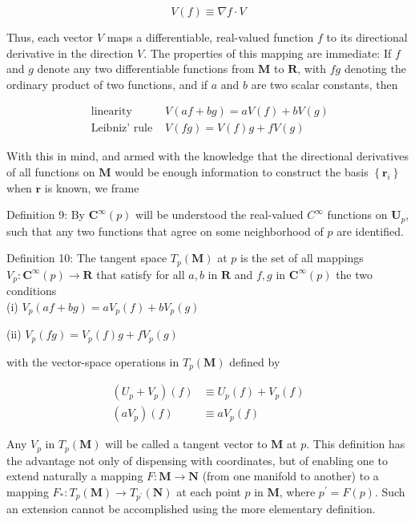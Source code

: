 \documentclass[10pt]{article}
\begin{document}
$$
V(f) \equiv \nabla f \cdot V
$$

Thus, each vector $V$ maps a differentiable, real-valued function $f$ to its directional derivative in the direction $V$. The properties of this mapping are immediate: If $f$ and $g$ denote any two differentiable functions from $\mathbf{M}$ to $\mathbf{R}$, with $f g$ denoting the ordinary product of two functions, and if $a$ and $b$ are two scalar constants, then

$$
\begin{aligned}
\text { linearity } & V(a f+b g)=a V(f)+b V(g) \\
\text { Leibniz' rule } & V(f g)=V(f) g+f V(g)
\end{aligned}
$$

With this in mind, and armed with the knowledge that the directional derivatives of all functions on $\mathbf{M}$ would be enough information to construct the basis $\left\{\mathbf{r}_{i}\right\}$ when $\mathbf{r}$ is known, we frame

Definition 9: By $\mathbf{C}^{\infty}(p)$ will be understood the real-valued $C^{\infty}$ functions on $\mathbf{U}_{p}$, such that any two functions that agree on some neighborhood of $p$ are identified.

Definition 10: The tangent space $T_{p}(\mathbf{M})$ at $p$ is the set of all mappings $V_{p}: \mathbf{C}^{\infty}(p) \rightarrow \mathbf{R}$ that satisfy for all $a, b$ in $\mathbf{R}$ and $f, g$ in $\mathbf{C}^{\infty}(p)$ the two conditions\\
(i) $V_{p}(a f+b g)=a V_{p}(f)+b V_{p}(g)$

(ii) $V_{p}(f g)=V_{p}(f) g+f V_{p}(g)$

with the vector-space operations in $T_{p}(\mathbf{M})$ defined by

$$
\begin{aligned}
\left(U_{p}+V_{p}\right)(f) & \equiv U_{p}(f)+V_{p}(f) \\
\left(a V_{p}\right)(f) & \equiv a V_{p}(f)
\end{aligned}
$$

Any $V_{p}$ in $T_{p}(\mathbf{M})$ will be called a tangent vector to $\mathbf{M}$ at $p$. This definition has the advantage not only of dispensing with coordinates, but of enabling one to extend naturally a mapping $F: \mathbf{M} \rightarrow \mathbf{N}$ (from one manifold to another) to a mapping $F_{*}: T_{p}(\mathbf{M}) \rightarrow T_{p^{\prime}}(\mathbf{N})$ at each point $p$ in $\mathbf{M}$, where $p^{\prime}=F(p)$. Such an extension cannot be accomplished using the more elementary definition.
\end{document}

